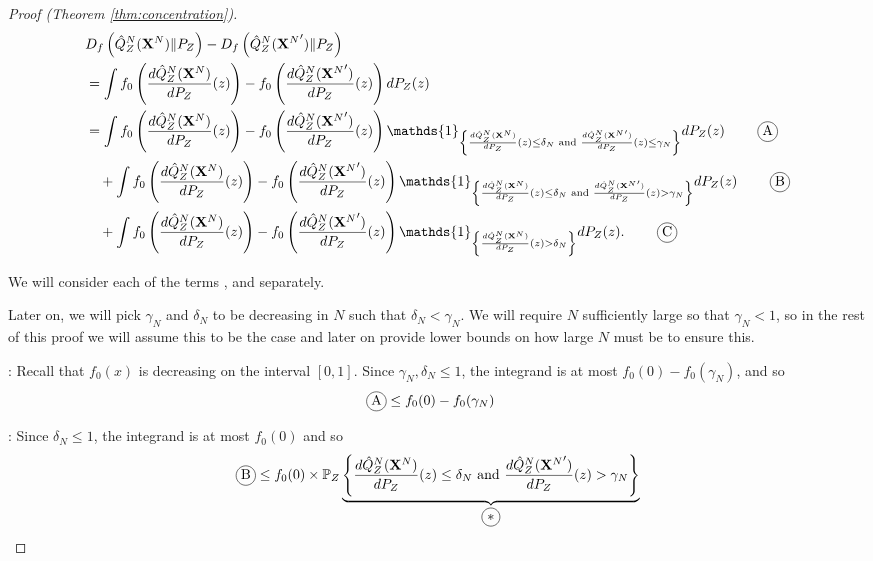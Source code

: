 \begin{proof}[Proof (Theorem \ref{thm:concentration})]
\begin{align*}
    & D_f\left( \hat{Q}_Z^N(\XN) \| P_Z\right) - D_f\left( \hat{Q}_Z^N({\XN}') \| P_Z\right)  \\
    &= \int f_0\left( \frac{d\hat{Q}_Z^N(\XN)}{dP_Z}(z) \right) - f_0\left( \frac{d\hat{Q}_Z^N({\XN}')}{dP_Z}(z) \right) dP_Z(z)  \\
    &= \int f_0\left( \frac{d\hat{Q}_Z^N(\XN)}{dP_Z}(z) \right) - f_0\left( \frac{d\hat{Q}_Z^N({\XN}')}{dP_Z}(z) \right) \mathds{1}_{\left\lbrace \frac{d\hat{Q}_Z^N(\XN)}{dP_Z}(z) \leq \delta_N \text{ and } \frac{d\hat{Q}_Z^N({\XN}')}{dP_Z}(z) \leq \gamma_N \right\rbrace} dP_Z(z) \tag*{\encircle{A}}\\
    & \quad + \int f_0\left( \frac{d\hat{Q}_Z^N(\XN)}{dP_Z}(z) \right) - f_0\left( \frac{d\hat{Q}_Z^N({\XN}')}{dP_Z}(z) \right) \mathds{1}_{\left\lbrace \frac{d\hat{Q}_Z^N(\XN)}{dP_Z}(z) \leq \delta_N \text{ and } \frac{d\hat{Q}_Z^N({\XN}')}{dP_Z}(z) > \gamma_N \right\rbrace} dP_Z(z) \tag*{\encircle{B}}\\
    & \quad + \int f_0\left( \frac{d\hat{Q}_Z^N(\XN)}{dP_Z}(z) \right) - f_0\left( \frac{d\hat{Q}_Z^N({\XN}')}{dP_Z}(z) \right) \mathds{1}_{\left\lbrace \frac{d\hat{Q}_Z^N(\XN)}{dP_Z}(z) > \delta_N \right\rbrace} dP_Z(z). \tag*{\encircle{C}}
\end{align*}

We will consider each of the terms ,  and   separately.

Later on, we will pick $\gamma_N$ and $\delta_N$ to be decreasing in $N$ such that $\delta_N < \gamma_N$.
We will require $N$ sufficiently large so that $\gamma_N< 1$, so in the rest of this proof we will assume this to be the case and later on provide lower bounds on how large $N$ must be to ensure this.

: 
Recall that $f_0(x)$ is decreasing on the interval $[0,1]$.
Since $\gamma_N, \delta_N \leq 1$, 
the integrand is at most $f_0(0) - f_0(\gamma_N)$, and so 
\begin{align*}
    \encircle{A} &\leq f_0(0) - f_0(\gamma_N)
\end{align*}


:
Since $\delta_N \leq 1$,
the integrand is at most $f_0(0)$ and so
\begin{align*}
    \encircle{B} &\leq f_0(0) \times \mathbb{P}_Z
    \underbrace{
    \left\lbrace \frac{d\hat{Q}_Z^N(\XN)}{dP_Z}(z) \leq \delta_N \text{ and } \frac{d\hat{Q}_Z^N({\XN}')}{dP_Z}(z) > \gamma_N \right\rbrace}_{\encircle{$*$}} \\
\end{align*}


\end{proof}
